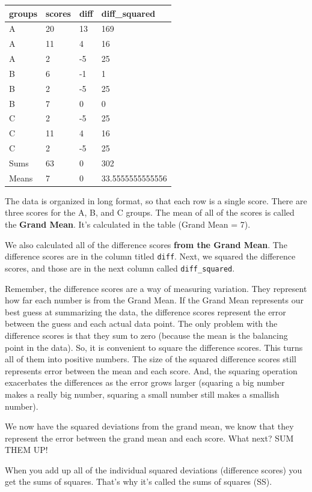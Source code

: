 \documentclass[
]{book}
\begin{document}
\begin{tabular}{l|l|l|l}
\hline
groups & scores & diff & diff\_squared\\
\hline
A & 20 & 13 & 169\\
\hline
A & 11 & 4 & 16\\
\hline
A & 2 & -5 & 25\\
\hline
B & 6 & -1 & 1\\
\hline
B & 2 & -5 & 25\\
\hline
B & 7 & 0 & 0\\
\hline
C & 2 & -5 & 25\\
\hline
C & 11 & 4 & 16\\
\hline
C & 2 & -5 & 25\\
\hline
Sums & 63 & 0 & 302\\
\hline
Means & 7 & 0 & 33.5555555555556\\
\hline
\end{tabular}

The data is organized in long format, so that each row is a single score. There are three scores for the A, B, and C groups. The mean of all of the scores is called the \textbf{Grand Mean}. It's calculated in the table (Grand Mean = 7).

We also calculated all of the difference scores \textbf{from the Grand Mean}. The difference scores are in the column titled \texttt{diff}. Next, we squared the difference scores, and those are in the next column called \texttt{diff\_squared}.

Remember, the difference scores are a way of measuring variation. They represent how far each number is from the Grand Mean. If the Grand Mean represents our best guess at summarizing the data, the difference scores represent the error between the guess and each actual data point. The only problem with the difference scores is that they sum to zero (because the mean is the balancing point in the data). So, it is convenient to square the difference scores. This turns all of them into positive numbers. The size of the squared difference scores still represents error between the mean and each score. And, the squaring operation exacerbates the differences as the error grows larger (squaring a big number makes a really big number, squaring a small number still makes a smallish number).

We now have the squared deviations from the grand mean, we know that they represent the error between the grand mean and each score. What next? SUM THEM UP!

When you add up all of the individual squared deviations (difference scores) you get the sums of squares. That's why it's called the sums of squares (SS).
\end{document}
